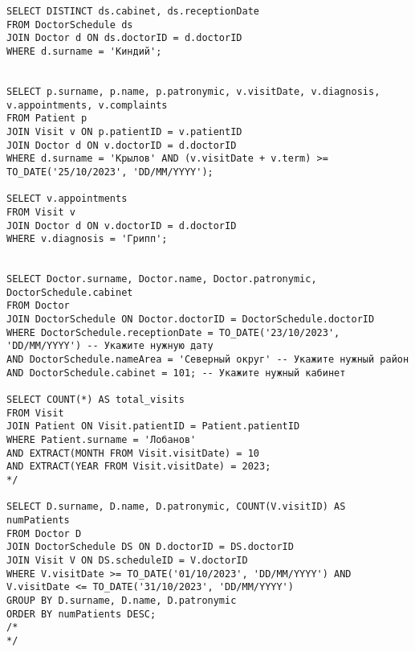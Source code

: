 \documentclass{article}
\begin{document}
{\begin{verbatim}
SELECT DISTINCT ds.cabinet, ds.receptionDate
FROM DoctorSchedule ds
JOIN Doctor d ON ds.doctorID = d.doctorID
WHERE d.surname = 'Киндий';


SELECT p.surname, p.name, p.patronymic, v.visitDate, v.diagnosis, v.appointments, v.complaints
FROM Patient p
JOIN Visit v ON p.patientID = v.patientID
JOIN Doctor d ON v.doctorID = d.doctorID
WHERE d.surname = 'Крылов' AND (v.visitDate + v.term) >= TO_DATE('25/10/2023', 'DD/MM/YYYY');

SELECT v.appointments
FROM Visit v
JOIN Doctor d ON v.doctorID = d.doctorID
WHERE v.diagnosis = 'Грипп';


SELECT Doctor.surname, Doctor.name, Doctor.patronymic, DoctorSchedule.cabinet
FROM Doctor
JOIN DoctorSchedule ON Doctor.doctorID = DoctorSchedule.doctorID
WHERE DoctorSchedule.receptionDate = TO_DATE('23/10/2023', 'DD/MM/YYYY') -- Укажите нужную дату
AND DoctorSchedule.nameArea = 'Северный округ' -- Укажите нужный район
AND DoctorSchedule.cabinet = 101; -- Укажите нужный кабинет

SELECT COUNT(*) AS total_visits
FROM Visit
JOIN Patient ON Visit.patientID = Patient.patientID
WHERE Patient.surname = 'Лобанов'
AND EXTRACT(MONTH FROM Visit.visitDate) = 10
AND EXTRACT(YEAR FROM Visit.visitDate) = 2023;
*/

SELECT D.surname, D.name, D.patronymic, COUNT(V.visitID) AS numPatients
FROM Doctor D
JOIN DoctorSchedule DS ON D.doctorID = DS.doctorID
JOIN Visit V ON DS.scheduleID = V.doctorID
WHERE V.visitDate >= TO_DATE('01/10/2023', 'DD/MM/YYYY') AND V.visitDate <= TO_DATE('31/10/2023', 'DD/MM/YYYY')
GROUP BY D.surname, D.name, D.patronymic
ORDER BY numPatients DESC;
/*
*/
\end{verbatim}
}
\end{document}
